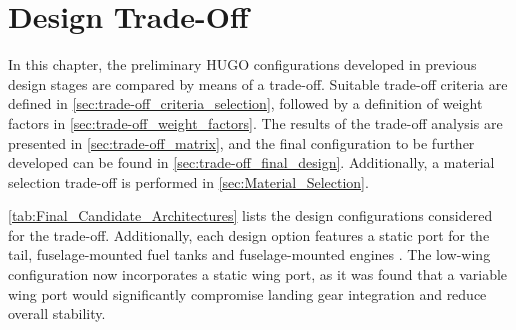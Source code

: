 \chapter{Design Trade-Off}
\label{ch:trade-off}
In this chapter, the preliminary HUGO configurations developed in previous design stages are compared by means of a trade-off. Suitable trade-off criteria are defined in \autoref{sec:trade-off_criteria_selection}, followed by a definition of weight factors in \autoref{sec:trade-off_weight_factors}. The results of the trade-off analysis are presented in \autoref{sec:trade-off_matrix}, and the final configuration to be further developed can be found in \autoref{sec:trade-off_final_design}. Additionally, a material selection trade-off is performed in \autoref{sec:Material_Selection}. 

\autoref{tab:Final_Candidate_Architectures} lists the design configurations considered for the trade-off. Additionally, each design option features a static port for the tail, fuselage-mounted fuel tanks and fuselage-mounted engines . The low-wing configuration now incorporates a static wing port, as it was found that a variable wing port would significantly compromise landing gear integration and reduce overall stability.

